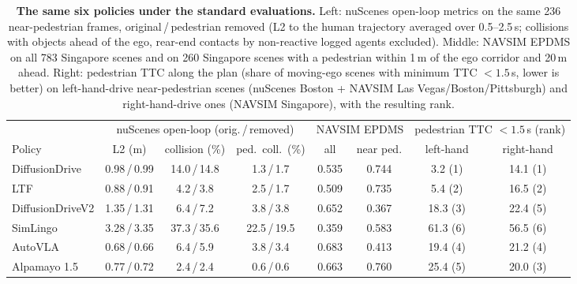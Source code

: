 \begin{table}[t]
\centering
\caption{\textbf{The same six policies under the standard evaluations.} Left: nuScenes open-loop metrics on the same 236 near-pedestrian frames, original\,/\,pedestrian removed (L2 to the human trajectory averaged over 0.5--2.5\,s; collisions with objects ahead of the ego, rear-end contacts by non-reactive logged agents excluded). Middle: NAVSIM EPDMS on all 783 Singapore scenes and on 260 Singapore scenes with a pedestrian within 1\,m of the ego corridor and 20\,m ahead. Right: pedestrian TTC along the plan (share of moving-ego scenes with minimum TTC $<1.5$\,s, lower is better) on left-hand-drive near-pedestrian scenes (nuScenes Boston + NAVSIM Las Vegas/Boston/Pittsburgh) and right-hand-drive ones (NAVSIM Singapore), with the resulting rank.}
\label{tab:bench}
\small
\setlength{\tabcolsep}{3pt}
\begin{tabular}{@{}lccc cc cc@{}}
\toprule
 & \multicolumn{3}{c}{nuScenes open-loop (orig.\,/\,removed)} & \multicolumn{2}{c}{NAVSIM EPDMS} & \multicolumn{2}{c}{pedestrian TTC $<1.5$\,s (rank)} \\
\cmidrule(lr){2-4}\cmidrule(lr){5-6}\cmidrule(l){7-8}
Policy & L2 (m) & collision (\%) & ped.\ coll.\ (\%) & all & near ped. & left-hand & right-hand \\
\midrule
DiffusionDrive & 0.98\,/\,0.99 & 14.0\,/\,14.8 & 1.3\,/\,1.7 & 0.535 & 0.744 & 3.2 (1) & 14.1 (1) \\
LTF & 0.88\,/\,0.91 & 4.2\,/\,3.8 & 2.5\,/\,1.7 & 0.509 & 0.735 & 5.4 (2) & 16.5 (2) \\
DiffusionDriveV2 & 1.35\,/\,1.31 & 6.4\,/\,7.2 & 3.8\,/\,3.8 & 0.652 & 0.367 & 18.3 (3) & 22.4 (5) \\
SimLingo & 3.28\,/\,3.35 & 37.3\,/\,35.6 & 22.5\,/\,19.5 & 0.359 & 0.583 & 61.3 (6) & 56.5 (6) \\
AutoVLA & 0.68\,/\,0.66 & 6.4\,/\,5.9 & 3.8\,/\,3.4 & 0.683 & 0.413 & 19.4 (4) & 21.2 (4) \\
Alpamayo 1.5 & 0.77\,/\,0.72 & 2.4\,/\,2.4 & 0.6\,/\,0.6 & 0.663 & 0.760 & 25.4 (5) & 20.0 (3) \\
\bottomrule
\end{tabular}
\end{table}
